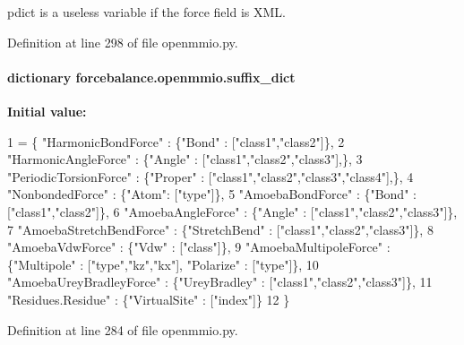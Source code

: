 pdict is a useless variable if the force field is X\-M\-L. 



Definition at line 298 of file openmmio.\-py.

\hypertarget{namespaceforcebalance_1_1openmmio_aeca37c08912f1a88339680ed75839530}{
\paragraph[{suffix\-\_\-dict}]{\setlength{\rightskip}{0pt plus 5cm}dictionary forcebalance.\-openmmio.\-suffix\-\_\-dict}}\label{namespaceforcebalance_1_1openmmio_aeca37c08912f1a88339680ed75839530}
{\bfseries Initial value\-:}
\begin{DoxyCode}
1 = \{ \textcolor{stringliteral}{"HarmonicBondForce"} : \{\textcolor{stringliteral}{"Bond"} : [\textcolor{stringliteral}{"class1"},\textcolor{stringliteral}{"class2"}]\},
2                 \textcolor{stringliteral}{"HarmonicAngleForce"} : \{\textcolor{stringliteral}{"Angle"} : [\textcolor{stringliteral}{"class1"},\textcolor{stringliteral}{"class2"},\textcolor{stringliteral}{"class3"}],\},
3                 \textcolor{stringliteral}{"PeriodicTorsionForce"} : \{\textcolor{stringliteral}{"Proper"} : [\textcolor{stringliteral}{"class1"},\textcolor{stringliteral}{"class2"},\textcolor{stringliteral}{"class3"},\textcolor{stringliteral}{"class4"}],\},
4                 \textcolor{stringliteral}{"NonbondedForce"} : \{\textcolor{stringliteral}{"Atom"}: [\textcolor{stringliteral}{"type"}]\},
5                 \textcolor{stringliteral}{"AmoebaBondForce"} : \{\textcolor{stringliteral}{"Bond"} : [\textcolor{stringliteral}{"class1"},\textcolor{stringliteral}{"class2"}]\},
6                 \textcolor{stringliteral}{"AmoebaAngleForce"} : \{\textcolor{stringliteral}{"Angle"} : [\textcolor{stringliteral}{"class1"},\textcolor{stringliteral}{"class2"},\textcolor{stringliteral}{"class3"}]\},
7                 \textcolor{stringliteral}{"AmoebaStretchBendForce"} : \{\textcolor{stringliteral}{"StretchBend"} : [\textcolor{stringliteral}{"class1"},\textcolor{stringliteral}{"class2"},\textcolor{stringliteral}{"class3"}]\},
8                 \textcolor{stringliteral}{"AmoebaVdwForce"} : \{\textcolor{stringliteral}{"Vdw"} : [\textcolor{stringliteral}{"class"}]\},
9                 \textcolor{stringliteral}{"AmoebaMultipoleForce"} : \{\textcolor{stringliteral}{"Multipole"} : [\textcolor{stringliteral}{"type"},\textcolor{stringliteral}{"kz"},\textcolor{stringliteral}{"kx"}], \textcolor{stringliteral}{"Polarize"} : [\textcolor{stringliteral}{"type"}]\},
10                 \textcolor{stringliteral}{"AmoebaUreyBradleyForce"} : \{\textcolor{stringliteral}{"UreyBradley"} : [\textcolor{stringliteral}{"class1"},\textcolor{stringliteral}{"class2"},\textcolor{stringliteral}{"class3"}]\},
11                 \textcolor{stringliteral}{"Residues.Residue"} : \{\textcolor{stringliteral}{"VirtualSite"} : [\textcolor{stringliteral}{"index"}]\}
12                 \}
\end{DoxyCode}


Definition at line 284 of file openmmio.\-py.

